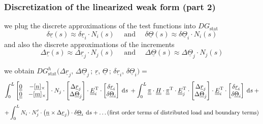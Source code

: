 \begin{frame}
  \frametitle{Discretization of the linearized weak form (part 2)}

  we plug the discrete approximations of the test functions into $DG_{\text{stat}}$
  \begin{displaymath}
    \delta \underline{r}(s) \approx \delta \underline{r}_i \cdot N_i(s)
    \quad \text{ and } \quad
    \delta \underline{\Theta}(s) \approx \delta \underline{\Theta}_i \cdot N_i(s)
  \end{displaymath}
  and also the discrete approximations of the increments
  \begin{displaymath}
    \Delta \underline{r}(s) \approx \Delta \underline{r}_j \cdot N_j(s)
    \quad \text{ and } \quad
    \Delta \underline{\Theta}(s) \approx \Delta \underline{\Theta}_j \cdot N_j(s)
  \end{displaymath}
  
  we obtain $DG_{\text{stat}}^h \bigl( \Delta \underline{r}_j , \, \Delta \underline{\Theta}_j \, ; \,\underline{r} , \, \underline{\Theta} \, ; \, \delta \underline{r}_i , \, \delta \underline{\Theta}_i \bigr) =$
  \begin{displaymath}
    \int_0^L
      \begin{bmatrix}
        \doubleunderline{0} & - [ \underline{n} ]_{\times} \\
        \doubleunderline{0} & - [ \underline{m} ]_{\times}
      \end{bmatrix} \cdot N_j \cdot
      \begin{bmatrix}
        \Delta \underline{r}_j \\
        \Delta \underline{\Theta}_j
      \end{bmatrix} \cdot
      \doubleunderline{E}_i^{\mathrm{T}} \cdot
      \begin{bmatrix}
        \delta \underline{r}_i \\ \delta \underline{\Theta}_i
      \end{bmatrix}
    \: \dif s \:
    + \int_0^L
      \doubleunderline{\pi} \cdot
      \doubleunderline{H} \cdot
      \doubleunderline{\pi}^{\mathrm{T}} \cdot
      \doubleunderline{E}_j^{\mathrm{T}} \cdot
      \begin{bmatrix}
        \Delta \underline{r}_j \\
        \Delta \underline{\Theta}_j
      \end{bmatrix} \cdot
      \doubleunderline{E}_i^{\mathrm{T}} \cdot
      \begin{bmatrix}
        \delta \underline{r}_i \\ \delta \underline{\Theta}_i
      \end{bmatrix}
    \: \dif s \: +
  \end{displaymath}
  \begin{displaymath}
   + \int_0^L
      N_i \cdot N_j^{\prime} \cdot \bigl( \underline{n} \times \Delta \underline{r}_j \bigr) \cdot \delta \underline{\Theta}_i
    \: \dif s
   + \dots (\text{first order terms of distributed load and boundary terms})
  \end{displaymath}
  

\end{frame}
